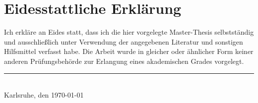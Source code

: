 \documentclass[
english,
oneside,
paper=A4,
fontsize=11pt,
BCOR=2mm,				%
DIV=default,			%
open=any,				%
listof=toc, 
bibliography=totoc,
parskip=half			%
]{Thesis} %
\title{\ttitle} %
\begin{document}
	
	\frontmatter %
	
	
	\fancyhead{} %
	\rhead{\thepage} %
	\lhead{} %
	
	\pagestyle{fancy} %
	
	\newcommand{\HRule}{\rule{\linewidth}{0.5mm}} %
	
	\newcommand{\brparagraph}[1]{\paragraph{#1}\mbox{}\\}
	
	\newcommand{\source}[1]{\caption*{Source: {#1}} }
	
	\hypersetup{pdfsubject=\subjectname}
	\hypersetup{pdfauthor=\authornames}
	\hypersetup{pdfkeywords=\keywordnames}
	
	
	
	
	\newpage
	
	\section*{Eidesstattliche Erklärung}
	
	Ich erkläre an Eides statt, dass ich die hier vorgelegte Master-Thesis selbstständig und
	ausschließlich unter Verwendung der angegebenen Literatur und sonstigen Hilfsmittel verfasst habe.
	Die Arbeit wurde in gleicher oder ähnlicher Form keiner anderen Prüfungsbehörde zur Erlangung
	eines akademischen Grades vorgelegt.
	
	\vspace{1.3cm}
	
	\noindent\rule[-0.1cm]{6cm}{0.5pt}\\
	Karlsruhe, den \today
	\newpage
	
\end{document}
